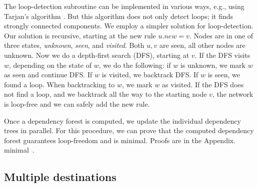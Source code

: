 
The loop-detection subroutine can be implemented in various ways, e.g., using
Tarjan's algorithm \cite{tarjan72}. But this algorithm does not only detect loops; it finds strongly connected components. We employ a simpler solution for loop-detection. Our solution is recursive, starting at the new rule $u.new = v$. Nodes are in one of three states, \emph{unknown}, \emph{seen}, and \emph{visited}. Both $u,v$ are seen, all other nodes are unknown. Now we do a depth-first search (DFS), starting at $v$. If the DFS visits $w$, depending on the state of $w$, we do the following: if $w$ is unknown, we mark $w$ as seen and continue DFS. If $w$ is visited, we backtrack DFS. If $w$ is seen, we found a loop. When backtracking to $w$, we mark $w$ as visited. If the DFS does not find a loop, and we backtrack all the way to the starting node $v$, the network is loop-free and we can safely add the new rule.




Once a dependency forest is computed, we update the individual dependency trees in parallel. For this procedure, we can prove that the computed dependency forest guarantees loop-freedom and is
\iflongversion
minimal. Proofs are in the Appendix.
\else
minimal~\cite{tr}.
\fi

\subsection{Multiple destinations}
\label{sec:multidest}

